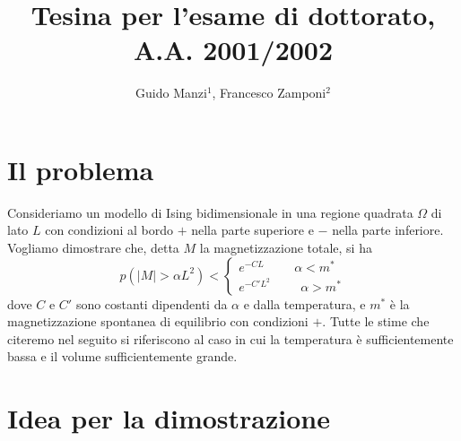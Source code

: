 \documentclass[aps,pre]{revtex4}
\newcommand{\beq}{\begin{equation}}
\newcommand{\eeq}{\end{equation}}
\begin{document}
\title{Tesina per l'esame di dottorato, A.A. 2001/2002} 

\author{Guido Manzi$^1$, Francesco Zamponi$^2$} 



\maketitle


\section{Il problema}

\noindent
Consideriamo un modello di Ising bidimensionale in una regione quadrata $\Omega$ di lato $L$ con condizioni al bordo $+$ nella parte superiore e $-$ nella parte inferiore. Vogliamo dimostrare che, detta $M$ la magnetizzazione totale, si ha
\beq
p(|M|> \alpha L^2) < 
\begin{cases} 
e^{- C L} \hspace{1cm} \alpha < m^* \\
e^{- C' L^2}  \hspace{1cm}  \alpha > m^*
\end{cases}
\eeq
dove $C$ e $C'$ sono costanti dipendenti da $\alpha$ e dalla temperatura, e $m^*$ \`e la magnetizzazione spontanea di equilibrio con condizioni $+$. Tutte le stime che citeremo nel seguito si riferiscono al caso in cui la temperatura \`e sufficientemente bassa e il volume sufficientemente grande.

\section{Idea per la dimostrazione}
\end{document}
